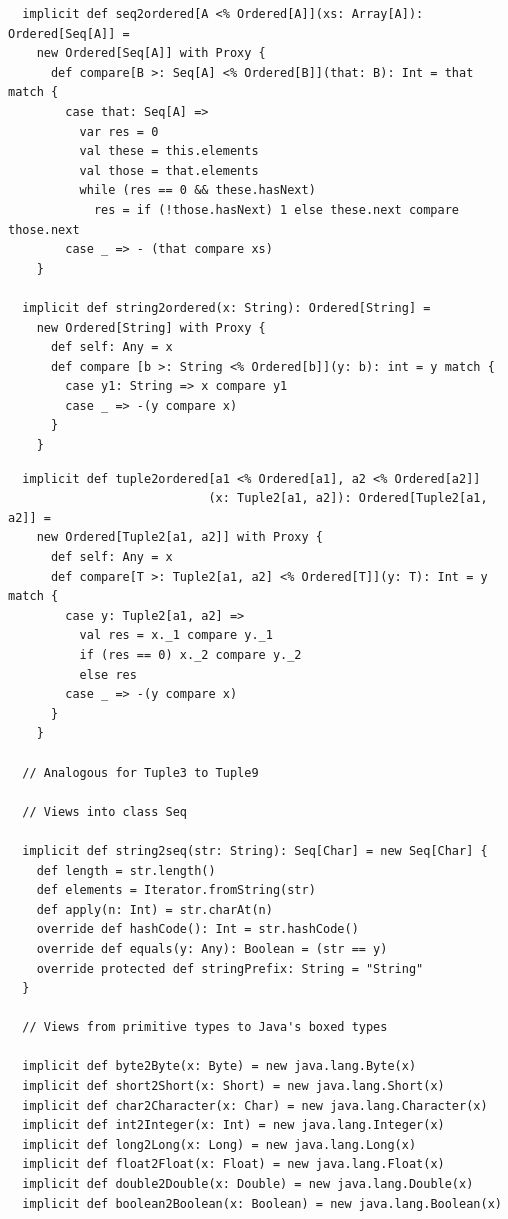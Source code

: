 {\begin{lstlisting}
  implicit def seq2ordered[A <% Ordered[A]](xs: Array[A]): Ordered[Seq[A]] = 
    new Ordered[Seq[A]] with Proxy {
      def compare[B >: Seq[A] <% Ordered[B]](that: B): Int = that match {
        case that: Seq[A] =>
          var res = 0
          val these = this.elements
          val those = that.elements
          while (res == 0 && these.hasNext)
            res = if (!those.hasNext) 1 else these.next compare those.next
        case _ => - (that compare xs)
    }

  implicit def string2ordered(x: String): Ordered[String] = 
    new Ordered[String] with Proxy {
      def self: Any = x
      def compare [b >: String <% Ordered[b]](y: b): int = y match {
        case y1: String => x compare y1
        case _ => -(y compare x)
      }
    }
\end{lstlisting}
\newpage
\begin{lstlisting}
  implicit def tuple2ordered[a1 <% Ordered[a1], a2 <% Ordered[a2]]
                            (x: Tuple2[a1, a2]): Ordered[Tuple2[a1, a2]] = 
    new Ordered[Tuple2[a1, a2]] with Proxy {
      def self: Any = x
      def compare[T >: Tuple2[a1, a2] <% Ordered[T]](y: T): Int = y match {
        case y: Tuple2[a1, a2] => 
          val res = x._1 compare y._1
          if (res == 0) x._2 compare y._2
          else res
        case _ => -(y compare x)
      }
    }

  // Analogous for Tuple3 to Tuple9

  // Views into class Seq

  implicit def string2seq(str: String): Seq[Char] = new Seq[Char] {
    def length = str.length()
    def elements = Iterator.fromString(str)
    def apply(n: Int) = str.charAt(n)
    override def hashCode(): Int = str.hashCode()
    override def equals(y: Any): Boolean = (str == y)
    override protected def stringPrefix: String = "String"
  }

  // Views from primitive types to Java's boxed types

  implicit def byte2Byte(x: Byte) = new java.lang.Byte(x)
  implicit def short2Short(x: Short) = new java.lang.Short(x)
  implicit def char2Character(x: Char) = new java.lang.Character(x)
  implicit def int2Integer(x: Int) = new java.lang.Integer(x)
  implicit def long2Long(x: Long) = new java.lang.Long(x)
  implicit def float2Float(x: Float) = new java.lang.Float(x)
  implicit def double2Double(x: Double) = new java.lang.Double(x)
  implicit def boolean2Boolean(x: Boolean) = new java.lang.Boolean(x)


\end{lstlisting}}
